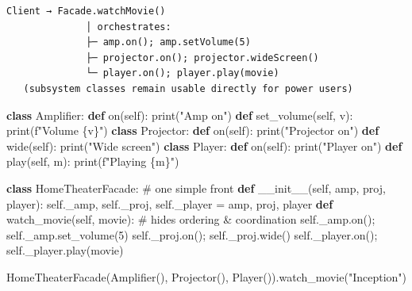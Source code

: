 \documentclass[11pt]{article}
\newenvironment{Shaded}{\begin{snugshade}}{\end{snugshade}}
\newcommand{\BuiltInTok}[1]{\textcolor[rgb]{0.50,0.55,0.55}{#1}}
\newcommand{\CommentTok}[1]{\textcolor[rgb]{0.48,0.49,0.49}{#1}}
\newcommand{\DecValTok}[1]{\textcolor[rgb]{0.96,0.45,0.00}{#1}}
\newcommand{\FunctionTok}[1]{\textcolor[rgb]{0.56,0.27,0.68}{#1}}
\newcommand{\KeywordTok}[1]{\textcolor[rgb]{0.81,0.81,0.76}{\textbf{#1}}}
\newcommand{\NormalTok}[1]{\textcolor[rgb]{0.81,0.81,0.76}{#1}}
\newcommand{\OperatorTok}[1]{\textcolor[rgb]{0.81,0.81,0.76}{#1}}
\newcommand{\SpecialCharTok}[1]{\textcolor[rgb]{0.24,0.68,0.91}{#1}}
\newcommand{\SpecialStringTok}[1]{\textcolor[rgb]{0.85,0.27,0.33}{#1}}
\newcommand{\StringTok}[1]{\textcolor[rgb]{0.96,0.31,0.31}{#1}}
\newcommand{\VariableTok}[1]{\textcolor[rgb]{0.15,0.68,0.68}{#1}}
\begin{document}
\begin{verbatim}
Client → Facade.watchMovie()
              │ orchestrates:
              ├─ amp.on(); amp.setVolume(5)
              ├─ projector.on(); projector.wideScreen()
              └─ player.on(); player.play(movie)
   (subsystem classes remain usable directly for power users)
\end{verbatim}


\begin{Shaded}
\begin{Highlighting}[]
\KeywordTok{class}\NormalTok{ Amplifier:}
    \KeywordTok{def}\NormalTok{ on(}\VariableTok{self}\NormalTok{): }\BuiltInTok{print}\NormalTok{(}\StringTok{"Amp on"}\NormalTok{)}
    \KeywordTok{def}\NormalTok{ set\_volume(}\VariableTok{self}\NormalTok{, v): }\BuiltInTok{print}\NormalTok{(}\SpecialStringTok{f"Volume }\SpecialCharTok{\{}\NormalTok{v}\SpecialCharTok{\}}\SpecialStringTok{"}\NormalTok{)}
\KeywordTok{class}\NormalTok{ Projector:}
    \KeywordTok{def}\NormalTok{ on(}\VariableTok{self}\NormalTok{): }\BuiltInTok{print}\NormalTok{(}\StringTok{"Projector on"}\NormalTok{)}
    \KeywordTok{def}\NormalTok{ wide(}\VariableTok{self}\NormalTok{): }\BuiltInTok{print}\NormalTok{(}\StringTok{"Wide screen"}\NormalTok{)}
\KeywordTok{class}\NormalTok{ Player:}
    \KeywordTok{def}\NormalTok{ on(}\VariableTok{self}\NormalTok{): }\BuiltInTok{print}\NormalTok{(}\StringTok{"Player on"}\NormalTok{)}
    \KeywordTok{def}\NormalTok{ play(}\VariableTok{self}\NormalTok{, m): }\BuiltInTok{print}\NormalTok{(}\SpecialStringTok{f"Playing }\SpecialCharTok{\{}\NormalTok{m}\SpecialCharTok{\}}\SpecialStringTok{"}\NormalTok{)}

\KeywordTok{class}\NormalTok{ HomeTheaterFacade:                 }\CommentTok{\# one simple front}
    \KeywordTok{def} \FunctionTok{\_\_init\_\_}\NormalTok{(}\VariableTok{self}\NormalTok{, amp, proj, player):}
        \VariableTok{self}\NormalTok{.\_amp, }\VariableTok{self}\NormalTok{.\_proj, }\VariableTok{self}\NormalTok{.\_player }\OperatorTok{=}\NormalTok{ amp, proj, player}
    \KeywordTok{def}\NormalTok{ watch\_movie(}\VariableTok{self}\NormalTok{, movie):        }\CommentTok{\# hides ordering \& coordination}
        \VariableTok{self}\NormalTok{.\_amp.on()}\OperatorTok{;} \VariableTok{self}\NormalTok{.\_amp.set\_volume(}\DecValTok{5}\NormalTok{)}
        \VariableTok{self}\NormalTok{.\_proj.on()}\OperatorTok{;} \VariableTok{self}\NormalTok{.\_proj.wide()}
        \VariableTok{self}\NormalTok{.\_player.on()}\OperatorTok{;} \VariableTok{self}\NormalTok{.\_player.play(movie)}

\NormalTok{HomeTheaterFacade(Amplifier(), Projector(), Player()).watch\_movie(}\StringTok{"Inception"}\NormalTok{)}
\end{Highlighting}
\end{Shaded}
\end{document}
